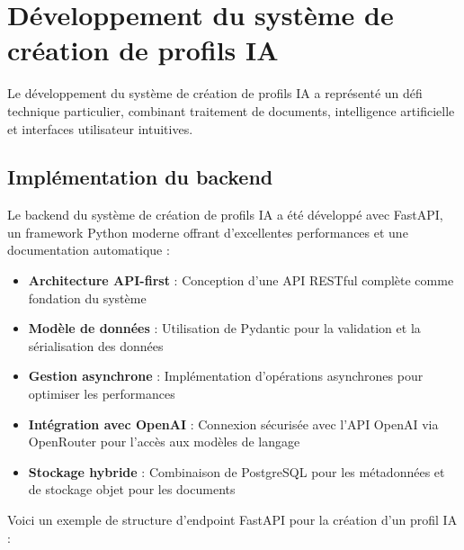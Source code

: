 \section{Développement du système de création de profils IA}

Le développement du système de création de profils IA a représenté un défi technique particulier, combinant traitement de documents, intelligence artificielle et interfaces utilisateur intuitives.

\subsection{Implémentation du backend}

Le backend du système de création de profils IA a été développé avec FastAPI, un framework Python moderne offrant d'excellentes performances et une documentation automatique :

\begin{itemize}
  \item \textbf{Architecture API-first} : Conception d'une API RESTful complète comme fondation du système
  
  \item \textbf{Modèle de données} : Utilisation de Pydantic pour la validation et la sérialisation des données
  
  \item \textbf{Gestion asynchrone} : Implémentation d'opérations asynchrones pour optimiser les performances
  
  \item \textbf{Intégration avec OpenAI} : Connexion sécurisée avec l'API OpenAI via OpenRouter pour l'accès aux modèles de langage
  
  \item \textbf{Stockage hybride} : Combinaison de PostgreSQL pour les métadonnées et de stockage objet pour les documents
\end{itemize}

Voici un exemple de structure d'endpoint FastAPI pour la création d'un profil IA :

